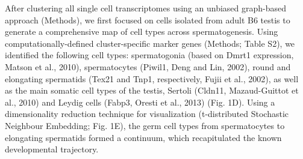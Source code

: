 After clustering all single cell transcriptomes using an unbiased graph-based approach (Methods), we first focused on cells isolated from adult B6 testis to generate a comprehensive map of cell types across spermatogenesis. Using computationally-defined cluster-specific marker genes (Methods; Table S2), we identified the following cell types: spermatogonia (based on Dmrt1 expression, Matson et al., 2010), spermatocytes (Piwil1, Deng and Lin, 2002), round and elongating spermatids (Tex21 and Tnp1, respectively, Fujii et al., 2002), as well as the main somatic cell types of the testis, Sertoli (Cldn11, Mazaud-Guittot et al., 2010) and Leydig cells (Fabp3, Oresti et al., 2013) (Fig. 1D). Using a dimensionality reduction technique for visualization (t-distributed Stochastic Neighbour Embedding; Fig. 1E), the germ cell types from spermatocytes to elongating spermatids formed a continuum, which recapitulated the known developmental trajectory.




